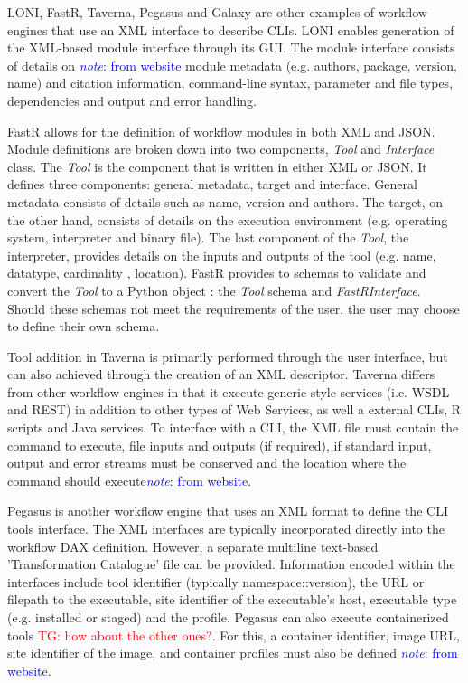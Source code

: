 \documentclass{report}
\newcommand{\note}[1]{\textcolor{blue}{\textit{note}: #1}}
\newcommand{\tristan}[1]{\textcolor{red}{TG: #1}}
\begin{document}
            LONI, FastR, Taverna, Pegasus and Galaxy are other examples of 
            workflow engines that 
            use an XML interface to describe CLIs. LONI enables generation of 
            the XML-based module interface through its GUI. The module interface
            consists of details on \note{from website} module metadata (e.g.
            authors, package, version, name) and citation information, 
            command-line syntax, parameter and file types, dependencies and 
            output and error handling.

            FastR allows for the definition of workflow modules in both XML and 
            JSON. Module definitions are broken down into two components, 
            \textit{Tool} and \textit{Interface} class. The \textit{Tool} is the
            component that is written in either XML or JSON. It defines three
            components: general metadata, target and interface. General metadata
            consists of details such as name, version and authors. The target, 
            on the other hand, consists of details on the execution environment
            (e.g. operating system, interpreter and binary file). The last 
            component of the \textit{Tool}, the interpreter, provides details on
            the inputs and outputs of the tool (e.g. name, datatype, cardinality
            , location). FastR provides to schemas to validate and convert the 
            \textit{Tool} to a Python object
            : the \textit{Tool} schema and \textit{FastRInterface}. Should these
            schemas not meet the requirements of the user, the user may choose 
            to define their own schema.

            Tool addition in Taverna is primarily performed through the user 
            interface, but can also achieved through the creation of an XML
            descriptor. Taverna differs from other workflow engines in that it
            execute generic-style services (i.e. WSDL and REST) in addition to
            other types of Web Services, as well a external CLIs, R scripts and
            Java services. To interface with a CLI, the XML file must contain 
            the command to execute, file inputs and outputs (if required), if 
            standard input, output and error streams must be conserved and the 
            location where the command should execute\note{from website}.

            Pegasus is another workflow engine that uses an XML format to 
            define the CLI tools interface. The XML interfaces are typically 
            incorporated directly into the workflow DAX definition. However, a 
            separate multiline text-based 'Transformation Catalogue' file can
            be provided. Information encoded within the interfaces include
            tool identifier (typically namespace::version), the URL or filepath
            to the executable, site identifier of the executable's host, 
            executable type (e.g. installed or staged) and the profile. Pegasus
            can also execute containerized tools \tristan{how about the other ones?}. For this, a container 
            identifier, image URL, site identifier of the image, and container
            profiles must also be defined \note{from website}.
\end{document}
